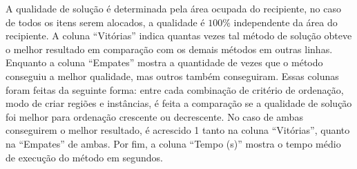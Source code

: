 A qualidade de solução é determinada pela área ocupada do recipiente, no caso de todos os itens
serem alocados, a qualidade é $100\%$ independente da área do recipiente.
A coluna “Vitórias” indica quantas vezes tal método de solução obteve o melhor resultado em
comparação com os demais métodos em outras linhas.
Enquanto a coluna “Empates” mostra a quantidade de vezes que o método conseguiu a melhor qualidade,
mas outros também conseguiram.
Essas colunas foram feitas da seguinte forma: entre cada combinação de critério de ordenação,
modo de criar regiões e instâncias, é feita a comparação se a qualidade de solução foi melhor
para ordenação crescente ou decrescente.
No caso de ambas conseguirem o melhor resultado, é acrescido 1 tanto na coluna “Vitórias”, quanto
na “Empates” de ambas.
Por fim, a coluna “Tempo (s)” mostra o tempo médio de execução do método em segundos.




